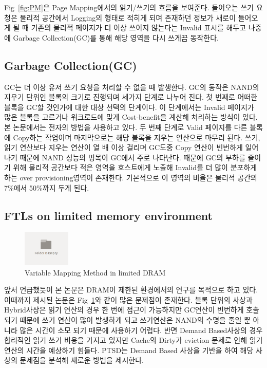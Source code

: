 \documentclass[conference]{IEEEtran}
\begin{document}
Fig~\ref{fig:PM}은 Page Mapping에서의 읽기/쓰기의 흐름을 보여준다. 들어오는 쓰기 요청은 물리적 공간에서
Logging의 형태로 적히게 되며 존재하던 정보가 새로이 들어오게 될 때 기존의 물리적 페이지가 더 이상
쓰이지 않는다는 Invalid 표시를 해두고 나중에 Garbage Collection(GC)를 통해 해당 영역을 다시 쓰게끔 동작한다.

\subsection{Garbage Collection(GC)}

GC는 더 이상 유저 쓰기 요청을 처리할 수 없을 때 발생한다. GC의 동작은 NAND의 지우기 단위인 블록의 크기로
진행되며 세가지 단계로 나누어 진다. 첫 번째로 어떠한 블록을 GC할 것인가에 대한 대상 선택의 단계이다.
이 단계에서는 Invalid 페이지가 많은 블록을 고르거나 워크로드에 맞게 Cost-benefit을 계산해 처리하는 방식이 있다.
본 논문에서는 전자의 방법을 사용하고 있다. 두 번째 단계로 Valid 페이지를 다른 블록에 Copy하는 작업이며
마지막으로는 해당 블록을 지우는 연산으로 마무리 된다. 쓰기, 읽기 연산보다 지우는 연산이 열 배 이상 걸리며 
GC도중 Copy 연산이 빈번하게 일어나기 때문에 NAND 성능의 병목이 GC에서 주로 나타난다. 때문에 GC의 부하를
줄이기 위해 물리적 공간보다 적은 영역을 호스트에게 노출해 Invalid를 더 많이 분포하게 하는
over provisioning영역이 존재한다. 기본적으로 이 영역의 비율은 물리적 공간의 7\%에서 50\%까지 두게 된다.

\subsection{FTLs on limited memory environment}
\begin{figure}[h]
	\centering
	\includegraphics[width=0.2\textwidth]{image/bg.png}
	\caption{Variable Mapping Method in limited DRAM}
	\label{fig:Map}
\end{figure}

앞서 언급했듯이 본 논문은 DRAM이 제한된 환경에서의 연구를 목적으로 하고 있다. 이때까지 제시된 논문은 
Fig~\ref{fig:Map}와 같이 많은 문제점이 존재한다. 블록 단위의 사상과 Hybrid사상은 읽기 연산의 경우 한 번에
접근이 가능하지만 GC연산이 빈번하게 호출되기 때문에 쓰기 연산이 많이 발생하게 되고 쓰기연산은 NAND의 수명을 
줄일 뿐 아니라 많은 시간이 소모 되기 때문에 사용하기 어렵다. 반면 Demand Based사상의 경우 합리적인 읽기 쓰기 
비용을 가지고 있지만 Cache의 Dirty가 eviction 문제로 인해 읽기 연산의 시간을 예상하기 힘들다.
PTSD는 Demand Based 사상을 기반을 하여 해당 사상의 문제점을 분석해 새로운 방법을 제시한다.
\end{document}
